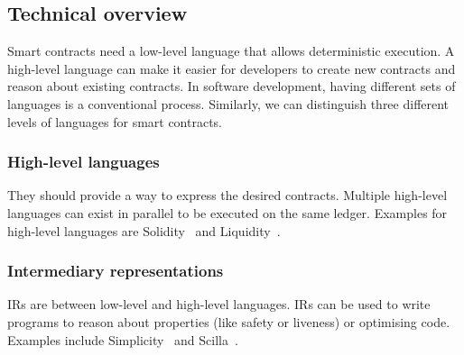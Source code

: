 

\subsection{Technical overview}
Smart contracts need a low-level language that allows deterministic execution. 
A high-level language can make it easier for developers to create new contracts and reason about existing contracts.
In software development, having different sets of languages is a conventional process.
Similarly, we can distinguish three different levels of languages for smart contracts.

\subsubsection{High-level languages} They should provide a way to express the desired contracts. Multiple high-level languages can exist in parallel to be executed on the same ledger. Examples for high-level languages are Solidity~\cite{Ethereum2018Solidity} and Liquidity~\cite{OCamlProSAS2018}.

\subsubsection{Intermediary representations} IRs are between low-level and high-level languages. IRs can be used to write programs to reason about properties (like safety or liveness) or optimising code. Examples include Simplicity~\cite{OConnor2017} and Scilla~\cite{Sergey2018}.

